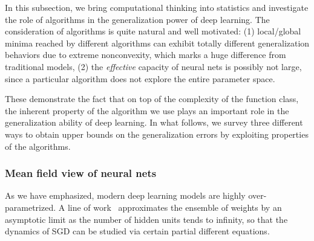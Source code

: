 In this subsection, we bring computational thinking into statistics and investigate the role of algorithms in the generalization power of deep learning. The consideration of algorithms is quite natural and well motivated: (1) local/global minima reached by different algorithms can exhibit totally different generalization behaviors due to extreme nonconvexity, which marks a huge difference from traditional models, (2) the \emph{effective }capacity of neural nets is possibly not large, since a particular algorithm does not explore the entire parameter space.

These demonstrate the fact that on top of the complexity of the function class,
the inherent property of the algorithm we use plays an important role in the generalization ability of deep learning. In what follows, we survey three different ways to obtain upper bounds on the generalization errors by exploiting properties of the algorithms.
\subsubsection{Mean field view of neural nets} As we have emphasized, modern deep learning models are highly over-parametrized. %
A line of work~\citep{mei2018mean,sirignano2018mean,rotskoff2018neural,chizat2018global,mei2019mean,javanmard2019analysis}
approximates the ensemble of weights by an asymptotic limit as the number of hidden units tends to infinity, so that the dynamics of SGD can be studied via certain partial different equations.

